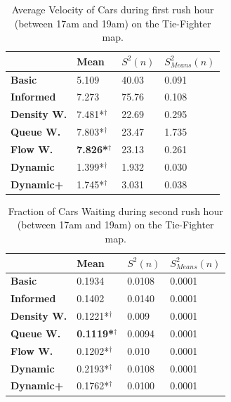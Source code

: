 \documentclass[11pt]{article}
\begin{document}
\begin{appendix}
\begin{table}[h]
\centering
\caption{Average Velocity of Cars during first rush hour (between 17am and 19am) on the Tie-Fighter map.}
\label{my-label}
\begin{tabular}{l|l|l|l|}
\textbf{}                 & \textbf{Mean} & \textbf{$S^2(n)$} & \textbf{$S_{Means}^2(n)$} \\
\hline\textbf{Basic}            & 5.109          & 40.03             & 0.091                      \\
\textbf{Informed}         & 7.273          & 75.76             & 0.108                      \\
\hline\textbf{Density W.} & 7.481*$^\dagger$          & 22.69             & 0.295                      \\
\textbf{Queue W.}   & 7.803*$^\dagger$          & 23.47             & 1.735                      \\
\textbf{Flow W.}    & \textbf{7.826*$^\dagger$} & 23.13             & 0.261                      \\
\textbf{Dynamic}          & 1.399*$^\dagger$          & 1.932             & 0.030                      \\
\textbf{Dynamic+}         & 1.745*$^\dagger$         & 3.031             & 0.038                     
\end{tabular}
\end{table}

\begin{table}[h]
\centering
\caption{Fraction of Cars Waiting during second rush hour (between 17am and 19am) on the Tie-Fighter map.}
\label{my-label}
\begin{tabular}{l|l|l|l|}
\textbf{}                 & \textbf{Mean} & \textbf{$S^2(n)$} & \textbf{$S_{Means}^2(n)$} \\
\hline\textbf{Basic}      & 0.1934          & 0.0108            & 0.0001                     \\
\textbf{Informed}   & 0.1402          & 0.0140            & 0.0001                     \\
\hline\textbf{Density W.} & 0.1221*$^\dagger$          & 0.009             & 0.0001                     \\
\textbf{Queue W.}   & \textbf{0.1119*$^\dagger$} & 0.0094            & 0.0001                     \\
\textbf{Flow W.}    & 0.1202*$^\dagger$          & 0.010             & 0.0001                     \\
\textbf{Dynamic}    & 0.2193*$^\dagger$         & 0.0108            & 0.0001                     \\
\textbf{Dynamic+}   & 0.1762*$^\dagger$          & 0.0100            & 0.0001                    
\end{tabular}
\end{table}
\vfill
\clearpage

\end{appendix}
\end{document}
